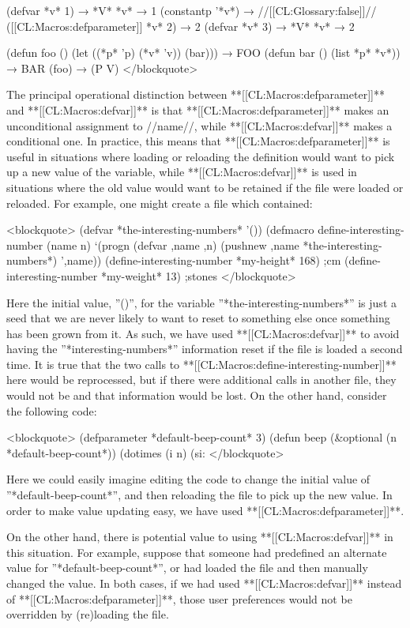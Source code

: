 (defvar *v* 1) → *V* *v* → 1 (constantp '*v*) → //[[CL:Glossary:false]]// ([[CL:Macros:defparameter]] *v* 2) → 2 (defvar *v* 3) → *V* *v* → 2

(defun foo () (let ((*p* 'p) (*v* 'v)) (bar))) → FOO (defun bar () (list *p* *v*)) → BAR (foo) → (P V) </blockquote>

The principal operational distinction between **[[CL:Macros:defparameter]]** and **[[CL:Macros:defvar]]** is that **[[CL:Macros:defparameter]]** makes an unconditional assignment to //name//, while **[[CL:Macros:defvar]]** makes a conditional one. In practice, this means that **[[CL:Macros:defparameter]]** is useful in situations where loading or reloading the definition would want to pick up a new value of the variable, while **[[CL:Macros:defvar]]** is used in situations where the old value would want to be retained if the file were loaded or reloaded. For example, one might create a file which contained:

<blockquote> (defvar *the-interesting-numbers* '()) (defmacro define-interesting-number (name n) `(progn (defvar ,name ,n) (pushnew ,name *the-interesting-numbers*) ',name)) (define-interesting-number *my-height* 168) ;cm (define-interesting-number *my-weight* 13) ;stones </blockquote>

Here the initial value, ''()'', for the variable ''*the-interesting-numbers*'' is just a seed that we are never likely to want to reset to something else once something has been grown from it. As such, we have used **[[CL:Macros:defvar]]** to avoid having the ''*interesting-numbers*'' information reset if the file is loaded a second time. It is true that the two calls to **[[CL:Macros:define-interesting-number]]** here would be reprocessed, but if there were additional calls in another file, they would not be and that information would be lost. On the other hand, consider the following code:

<blockquote> (defparameter *default-beep-count* 3) (defun beep (&optional (n *default-beep-count*)) (dotimes (i n) (si: </blockquote>

Here we could easily imagine editing the code to change the initial value of ''*default-beep-count*'', and then reloading the file to pick up the new value. In order to make value updating easy, we have used **[[CL:Macros:defparameter]]**.

On the other hand, there is potential value to using **[[CL:Macros:defvar]]** in this situation. For example, suppose that someone had predefined an alternate value for ''*default-beep-count*'', or had loaded the file and then manually changed the value. In both cases, if we had used **[[CL:Macros:defvar]]** instead of **[[CL:Macros:defparameter]]**, those user preferences would not be overridden by (re)loading the file.

